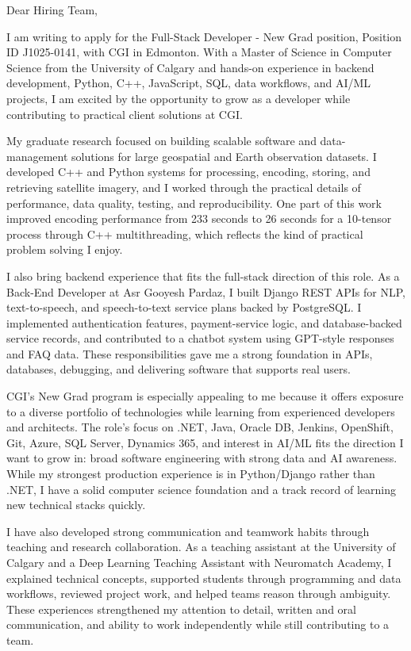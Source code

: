 \documentclass[11pt]{letter}
\begin{document}
\begin{letter}{}

\opening{Dear Hiring Team,}

I am writing to apply for the Full-Stack Developer - New Grad position, Position ID J1025-0141, with CGI in Edmonton. With a Master of Science in Computer Science from the University of Calgary and hands-on experience in backend development, Python, C++, JavaScript, SQL, data workflows, and AI/ML projects, I am excited by the opportunity to grow as a developer while contributing to practical client solutions at CGI.

My graduate research focused on building scalable software and data-management solutions for large geospatial and Earth observation datasets. I developed C++ and Python systems for processing, encoding, storing, and retrieving satellite imagery, and I worked through the practical details of performance, data quality, testing, and reproducibility. One part of this work improved encoding performance from 233 seconds to 26 seconds for a 10-tensor process through C++ multithreading, which reflects the kind of practical problem solving I enjoy.

I also bring backend experience that fits the full-stack direction of this role. As a Back-End Developer at Asr Gooyesh Pardaz, I built Django REST APIs for NLP, text-to-speech, and speech-to-text service plans backed by PostgreSQL. I implemented authentication features, payment-service logic, and database-backed service records, and contributed to a chatbot system using GPT-style responses and FAQ data. These responsibilities gave me a strong foundation in APIs, databases, debugging, and delivering software that supports real users.

CGI's New Grad program is especially appealing to me because it offers exposure to a diverse portfolio of technologies while learning from experienced developers and architects. The role's focus on .NET, Java, Oracle DB, Jenkins, OpenShift, Git, Azure, SQL Server, Dynamics 365, and interest in AI/ML fits the direction I want to grow in: broad software engineering with strong data and AI awareness. While my strongest production experience is in Python/Django rather than .NET, I have a solid computer science foundation and a track record of learning new technical stacks quickly.

I have also developed strong communication and teamwork habits through teaching and research collaboration. As a teaching assistant at the University of Calgary and a Deep Learning Teaching Assistant with Neuromatch Academy, I explained technical concepts, supported students through programming and data workflows, reviewed project work, and helped teams reason through ambiguity. These experiences strengthened my attention to detail, written and oral communication, and ability to work independently while still contributing to a team.


\end{letter}
\end{document}
